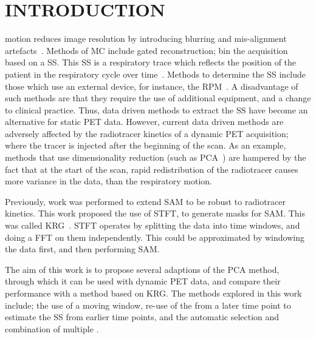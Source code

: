 \vspace{2cm}
\section{INTRODUCTION} \label{sec:introduction}
     motion reduces image resolution by introducing blurring and mis-alignment artefacts~\cite{Nehmeh2008a}. Methods of \gls{MC} include gated reconstruction; bin the acquisition based on a \gls{SS}. This \gls{SS} is a respiratory trace which reflects the position of the patient in the respiratory cycle over time~\cite{Kesner2010AMethods, Kesner2013GatingPET}. Methods to determine the \gls{SS} include those which use an external device, for instance, the \gls{RPM}~\cite{Bettinardi2013Motion-trackingPET/CT}. A disadvantage of such methods are that they require the use of additional equipment, and a change to clinical practice. Thus, data driven methods to extract the \gls{SS} have become an alternative for static \acrshort{PET} data. However, current data driven methods are adversely affected by the radiotracer kinetics of a dynamic \acrshort{PET} acquisition; where the tracer is injected after the beginning of the scan. As an example, methods that use dimensionality reduction (such as \acrshort{PCA}~\cite{Thielemans2011, Bertolli2018Data-DrivenTomography}) are hampered by the fact that at the start of the scan, rapid redistribution of the radiotracer causes more variance in the data, than the respiratory motion.
    
    Previously, work was performed to extend \gls{SAM} to be robust to radiotracer kinetics. This work proposed the use of \gls{STFT}, to generate masks for \gls{SAM}. This was called \gls{KRG}~\cite{Schleyer2014}. \gls{STFT} operates by splitting the data into time windows, and doing a \acrlong{FFT} on them independently. This could be approximated by windowing the data first, and then performing \gls{SAM}.
    
    The aim of this work is to propose several adaptions of the \acrshort{PCA} method, through which it can be used with dynamic \acrshort{PET} data, and compare their performance with a method based on \gls{KRG}. The methods explored in this work include; the use of a moving window, re-use of the  from a later time point to estimate the \gls{SS} from earlier time points, and the automatic selection and combination of multiple .

    
